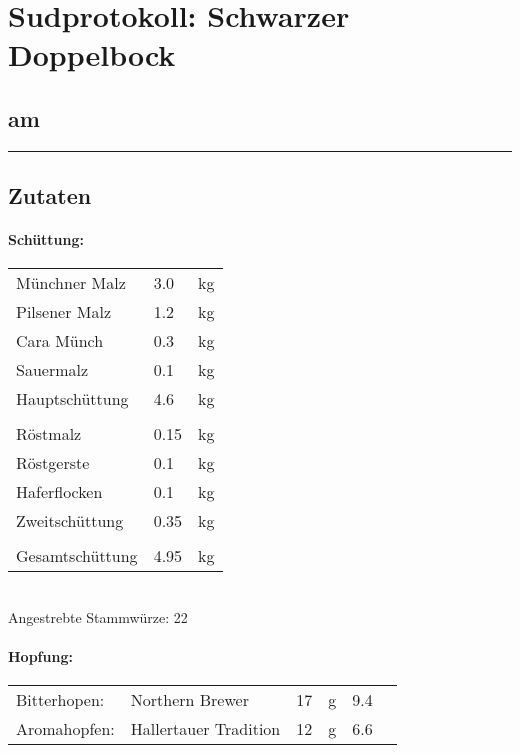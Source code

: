 \documentclass[12pt,oneside,a4paper]{scrartcl}
\begin{document}
	\begin{minipage}[c]{0.70\textwidth}
		\section*{\hspace{-.4cm}Sudprotokoll: Schwarzer Doppelbock}
	\end{minipage}
	\begin{minipage}[c]{0.29\textwidth}
		\subsection*{am }
	\end{minipage}
	\rule{\textwidth}{1pt}
%
\subsection*{Zutaten}
%
\paragraph{Schüttung:}
	\begin{tabular}[t]{m{8cm} m{2cm} m{1cm}}
		Münchner Malz & \num{3,0} & \si{\kilogram} \bigstrut\\
		Pilsener Malz & \num{1,2} & \si{\kilogram} \bigstrut\\
		Cara Münch & \num{0,3} & \si{\kilogram} \bigstrut\\
		Sauermalz & \num{0,1} & \si{\kilogram} \bigstrut\\\hline
		Hauptschüttung & \num{4,6} & \si{\kilogram} \bigstrut\\
		&&\\
		Röstmalz & \num{0,15} & \si{\kilogram} \bigstrut\\
		Röstgerste & \num{0,1} & \si{\kilogram} \bigstrut\\ 
		Haferflocken & \num{0,1} & \si{\kilogram} \bigstrut\\ \hline
		Zweitschüttung & \num{0,35} & \si{\kilogram} \bigstrut\\
		&&\\\hline\hline
		Gesamtschüttung & \num{4,95} & \si{\kilogram} \bigstrut
	\end{tabular}\\

\vspace{.25cm}
\hspace{1cm}Angestrebte Stammwürze: \SI{22}{\plato}
%
\paragraph{Hopfung:}
	\begin{tabular}[t]{m{2.5cm} m{5cm} m{0.5cm} m{1cm} m{0.5cm} m{1cm}}
		Bitterhopen: & Northern Brewer & \num{17} & \si{\gram} & \num{9,4} & \si{\peralpha} \\
		Aromahopfen: & Hallertauer Tradition &\num{12} & \si{\gram} & \num{6,6} &  \si{\peralpha}
	\end{tabular}\\
\end{document}
